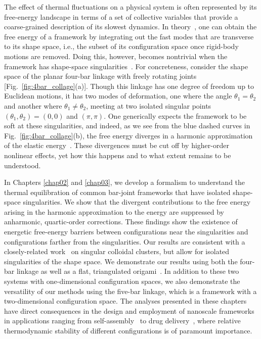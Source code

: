 The effect of thermal fluctuations on a physical system is often represented by its free-energy landscape in terms of a set of collective variables that provide a coarse-grained description of its slowest dynamics.
In theory~\cite{go1976,echenique2011}, one can obtain the free energy of a framework by integrating out the fast modes that are transverse to its shape space, i.e., the subset of its configuration space once rigid-body motions are removed.
Doing this, however, becomes nontrivial when the framework has shape-space singularities~\cite{zlatanov2002,liu2003,donelan2007}.
For concreteness, consider the shape space of the planar four-bar linkage with freely rotating joints~\cite{grashof1883,hartenberg1964,shimamoto2005} [Fig.~\ref{fig:4bar_collage}(a)].
Though this linkage has one degree of freedom up to Euclidean motions, it has two modes of deformation, one where the angle $\theta_1 = \theta_2$ and another where $\theta_1 \ne \theta_2$, meeting at two isolated singular points $(\theta_1,\theta_2) = (0,0)$ and $(\pi,\pi)$.
One generically expects the framework to be soft at these singularities, and indeed, as we see from the blue dashed curves in Fig.~\ref{fig:4bar_collage}(b), the free energy diverges in a harmonic approximation of the elastic energy~\cite{rocklin2018}.
These divergences must be cut off by higher-order nonlinear effects, yet how this happens and to what extent remains to be understood.

In Chapters \ref{chap02} and \ref{chap03}, we develop a formalism to understand the thermal equilibration of common bar-joint frameworks that have isolated shape-space singularities.
We show that the divergent contributions to the free energy arising in the harmonic approximation to the energy are suppressed by anharmonic, quartic-order corrections.
These findings show the existence of energetic free-energy barriers between configurations near the singularities and configurations farther from the singularities.
Our results are consistent with a closely-related work~\cite{kallus2017,holmes-cerfon2017} on singular colloidal clusters, but allow for isolated singularities of the shape space.
We demonstrate our results using both the four-bar linkage as well as a flat, triangulated origami~\cite{chen2018}.
In addition to these two systems with one-dimensional configuration spaces, we also demonstrate the versatility of our methods using the five-bar linkage, which is a framework with a two-dimensional configuration space.
The analyses presented in these chapters have direct consequences in the design and employment of nanoscale frameworks in applications ranging from self-assembly~\cite{liedl2010} to drug delivery~\cite{zhao2019}, where relative thermodynamic stability of different configurations is of paramount importance.

